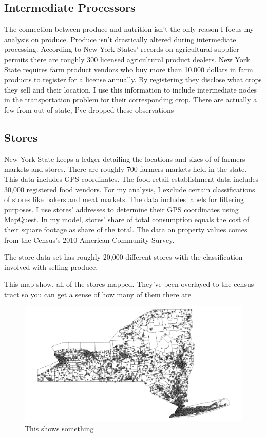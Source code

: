 \documentclass{report}
\begin{document}
\subsection{Intermediate Processors}
The connection between produce and nutrition isn't the only reason I focus my analysis on produce. Produce isn't drastically altered during intermediate processing. According to New York States' records on agricultural supplier permits there are roughly 300 licensed agricultural product dealers. New York State requires farm product vendors who buy more than 10,000 dollars in farm products to register for a license annually. By registering they disclose what crops they sell and their location. I use this information to include intermediate nodes in the transportation problem for their corresponding crop.
There are actually a few from out of state, I've dropped these observations


\subsection{Stores}

New York State keeps a ledger detailing the locations and sizes of of farmers markets and stores. There are roughly 700 farmers markets held in the state. This data includes GPS coordinates. The food retail establishment data includes 30,000 registered food vendors. For my analysis, I exclude certain classifications of stores like bakers and meat markets. The data includes labels for filtering purposes. I use stores' addresses to determine their GPS coordinates using MapQuest. In my model, stores' share of total consumption equals the cost of their square footage as share of the total. The data on property values comes from the Census's 2010 American Community Survey.

The store data set has roughly 20,000 different stores with the classification involved with selling produce.

This map show, all of the stores mapped. They've been overlayed to the census tract so you can get a sense of how many of them there are

\begin{figure}
\centering
\begin{framed}
\includegraphics[scale=.4]{map_3}
\caption{This shows something}
\end{framed}
\end{figure}
\end{document}
